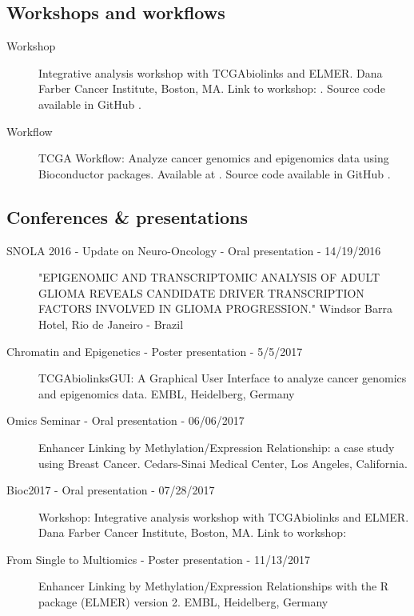 \subsection{Workshops and workflows}
\begin{description}
\item[Workshop]{Integrative analysis workshop with TCGAbiolinks and ELMER. Dana Farber Cancer Institute, Boston, MA. Link to workshop: . Source code available in GitHub .}
\item[Workflow]{TCGA Workflow: Analyze cancer genomics and epigenomics data using Bioconductor packages. Available at . Source code available in GitHub .}

\end{description}

\subsection{Conferences \& presentations}
\begin{description}
	\item[SNOLA 2016 - Update on Neuro-Oncology - Oral presentation - 14/19/2016]{"EPIGENOMIC AND TRANSCRIPTOMIC ANALYSIS OF ADULT GLIOMA
REVEALS CANDIDATE DRIVER TRANSCRIPTION FACTORS
INVOLVED IN GLIOMA PROGRESSION." Windsor Barra Hotel, Rio de Janeiro - Brazil}
    \item[Chromatin and Epigenetics - Poster presentation - 5/5/2017]{TCGAbiolinksGUI: A Graphical User Interface to analyze cancer genomics and epigenomics data. EMBL, Heidelberg, Germany}
	\item[Omics Seminar - Oral presentation - 06/06/2017]{Enhancer Linking by Methylation/Expression Relationship: a case study using Breast Cancer. Cedars-Sinai Medical Center, Los Angeles, California.}
	\item[Bioc2017 - Oral presentation - 07/28/2017]{Workshop: Integrative analysis workshop with TCGAbiolinks and ELMER. Dana Farber Cancer Institute, Boston, MA. Link to workshop: }
\item[From Single to Multiomics - Poster presentation - 11/13/2017]{Enhancer Linking by Methylation/Expression Relationships with the R package (ELMER) version 2. EMBL, Heidelberg, Germany}

\end{description}


%
